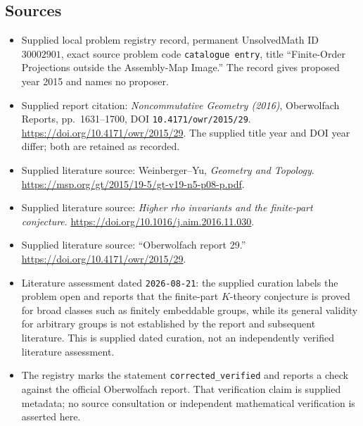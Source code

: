 \documentclass[11pt]{article}
\begin{document}
\subsection{Sources}
\begin{itemize}
\item Supplied local problem registry record, permanent UnsolvedMath ID \(30002901\), exact source problem code \texttt{catalogue entry}, title ``Finite-Order Projections outside the Assembly-Map Image.'' The record gives proposed year 2015 and names no proposer.
\item Supplied report citation: \emph{Noncommutative Geometry (2016)}, Oberwolfach Reports, pp.~1631--1700, DOI \texttt{10.4171/owr/2015/29}. \url{https://doi.org/10.4171/owr/2015/29}. The supplied title year and DOI year differ; both are retained as recorded.
\item Supplied literature source: Weinberger--Yu, \emph{Geometry and Topology}. \url{https://msp.org/gt/2015/19-5/gt-v19-n5-p08-p.pdf}.
\item Supplied literature source: \emph{Higher rho invariants and the finite-part conjecture}. \url{https://doi.org/10.1016/j.aim.2016.11.030}.
\item Supplied literature source: ``Oberwolfach report 29.'' \url{https://doi.org/10.4171/owr/2015/29}.
\item Literature assessment dated \texttt{2026-08-21}: the supplied curation labels the problem open and reports that the finite-part \(K\)-theory conjecture is proved for broad classes such as finitely embeddable groups, while its general validity for arbitrary groups is not established by the report and subsequent literature. This is supplied dated curation, not an independently verified literature assessment.
\item The registry marks the statement \texttt{corrected\_verified} and reports a check against the official Oberwolfach report. That verification claim is supplied metadata; no source consultation or independent mathematical verification is asserted here.
\end{itemize}
\end{document}
